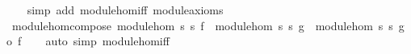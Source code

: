 \begin{isabellebody}
%
\isadelimproof
\ \ %
\endisadelimproof
%
\isatagproof
{}\isamarkupfalse%
\ {\isacharparenleft}{\kern0pt}simp\ add{\isacharcolon}{\kern0pt}\ module{\isacharunderscore}{\kern0pt}hom{\isacharunderscore}{\kern0pt}iff\ module{\isacharunderscore}{\kern0pt}axioms{\isacharparenright}{\kern0pt}%
\endisatagproof
{\isafoldproof}%
%
\isadelimproof
\isanewline
%
\endisadelimproof
\isanewline
{}\isamarkupfalse%
\isanewline
\isanewline
{}\isamarkupfalse%
\ module{\isacharunderscore}{\kern0pt}hom{\isacharunderscore}{\kern0pt}compose{\isacharcolon}{\kern0pt}\ {\isachardoublequoteopen}module{\isacharunderscore}{\kern0pt}hom\ s{}\ s{}\ f\ {\isasymLongrightarrow}\ module{\isacharunderscore}{\kern0pt}hom\ s{}\ s{}\ g\ {\isasymLongrightarrow}\ module{\isacharunderscore}{\kern0pt}hom\ s{}\ s{}\ {\isacharparenleft}{\kern0pt}g\ o\ f{\isacharparenright}{\kern0pt}{\isachardoublequoteclose}\isanewline
%
\isadelimproof
\ \ %
\endisadelimproof
%
\isatagproof
{}\isamarkupfalse%
\ {\isacharparenleft}{\kern0pt}auto\ simp{\isacharcolon}{\kern0pt}\ module{\isacharunderscore}{\kern0pt}hom{\isacharunderscore}{\kern0pt}iff{\isacharparenright}{\kern0pt}%
\endisatagproof
{\isafoldproof}%
%
\isadelimproof
\isanewline
%
\endisadelimproof
%
\isadelimtheory
\isanewline
%
\endisadelimtheory
%
\isatagtheory
{}\isamarkupfalse%
%
\endisatagtheory
{\isafoldtheory}%
%
\isadelimtheory
%
\endisadelimtheory
%
\end{isabellebody}%
\endinput

